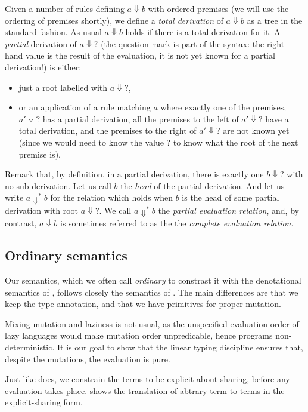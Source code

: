 \documentclass[acmsmall,screen]{acmart}\settopmatter{}
\begin{document}
{Given a number of rules defining $a⇓b$ with ordered premises (we will
use the ordering of premises shortly), we
define a \emph{total derivation} of $a⇓b$ as a tree in the standard
fashion. As usual $a⇓b$ holds if there is a total derivation for it.
A \emph{partial} derivation of $a⇓?$ (the question mark is part of the
syntax: the right-hand value is the result of the evaluation, it is
not yet known for a partial derivation!) is either:
\begin{itemize}
\item just a root labelled with $a⇓?$,
\item or an application of a rule matching $a$ where exactly one of
  the premises, $a'⇓?$ has a partial derivation, all the premises to
  the left of $a'⇓?$ have a total derivation, and the premises to the
  right of $a'⇓?$ are not known yet (since we would need to know the
  value $?$ to know what the root of the next premise is).
\end{itemize}

Remark that, by definition, in a partial derivation, there is exactly one
$b⇓?$ with no sub-derivation. Let us call $b$ the \emph{head} of the
partial derivation. And let us write $a⇓^*b$ for the relation which
holds when $b$ is the head of some partial derivation with root
$a⇓?$. We call $a⇓^*b$ the \emph{partial evaluation relation}, and, by
contrast, $a⇓b$ is sometimes referred to as the the \emph{complete
  evaluation relation}.

\subsection{Ordinary semantics}

Our semantics, which we often call \emph{ordinary} to constrast it
with the denotational semantics of , follows
closely the semantics of \citet{launchbury_natural_1993}. The main
differences are that we keep the type annotation, and that we have
primitives for proper mutation.

Mixing mutation and laziness is not usual, as the unspecified
evaluation order of lazy languages would make mutation order
unpredicable, hence programs non-deterministic. It is our goal to show
that the linear typing discipline ensures that, despite the mutations,
the evaluation is pure.

Just like \citet{launchbury_natural_1993} does, we constrain the terms
to be explicit about sharing, before any evaluation takes
place.  shows the translation of abtrary
term to terms in the explicit-sharing form.

}
\end{document}
